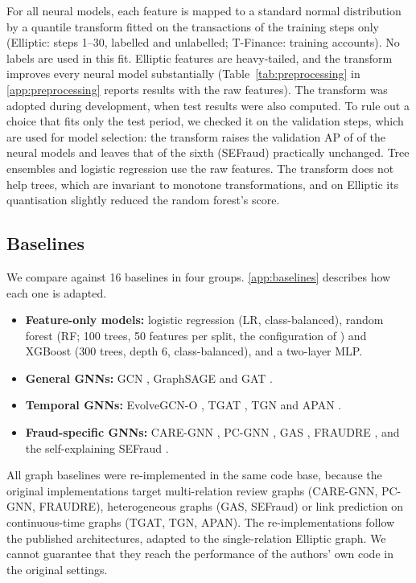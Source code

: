 For all neural models, each feature is mapped to a standard normal distribution by a quantile transform fitted on the transactions of the training steps only (Elliptic: steps 1--30, labelled and unlabelled; T-Finance: training accounts). No labels are used in this fit. Elliptic features are heavy-tailed, and the transform improves every neural model substantially (Table~\ref{tab:preprocessing} in \ref{app:preprocessing} reports results with the raw features). The transform was adopted during development, when test results were also computed. To rule out a choice that fits only the test period, we checked it on the validation steps, which are used for model selection: the transform raises the validation AP of \preNvalBetter{} of the \preNmodels{} neural models and leaves that of the sixth (SEFraud) practically unchanged. Tree ensembles and logistic regression use the raw features. The transform does not help trees, which are invariant to monotone transformations, and on Elliptic its quantisation slightly reduced the random forest's score.

\subsection{Baselines}
\label{subsec:baselines}

We compare against 16 baselines in four groups. \ref{app:baselines} describes how each one is adapted.
\begin{itemize}
\item \textbf{Feature-only models:} logistic regression (LR, class-balanced), random forest (RF; 100 trees, 50 features per split, the configuration of \citealp{weber2019anti}) and XGBoost \citep{chen2016xgboost} (300 trees, depth 6, class-balanced), and a two-layer MLP.
\item \textbf{General GNNs:} GCN \citep{kipf2017gcn}, GraphSAGE \citep{hamilton2017graphsage} and GAT \citep{velickovic2018gat}.
\item \textbf{Temporal GNNs:} EvolveGCN-O \citep{pareja2020evolvegcn}, TGAT \citep{xu2020tgat}, TGN \citep{rossi2020tgn} and APAN \citep{wang2021apan}.
\item \textbf{Fraud-specific GNNs:} CARE-GNN \citep{dou2020caregnn}, PC-GNN \citep{liu2021pcgnn}, GAS \citep{li2019gas}, FRAUDRE \citep{zhang2021fraudre}, and the self-explaining SEFraud \citep{li2024sefraud}.
\end{itemize}
All graph baselines were re-implemented in the same code base, because the original implementations target multi-relation review graphs (CARE-GNN, PC-GNN, FRAUDRE), heterogeneous graphs (GAS, SEFraud) or link prediction on continuous-time graphs (TGAT, TGN, APAN). The re-implementations follow the published architectures, adapted to the single-relation Elliptic graph. We cannot guarantee that they reach the performance of the authors' own code in the original settings.

